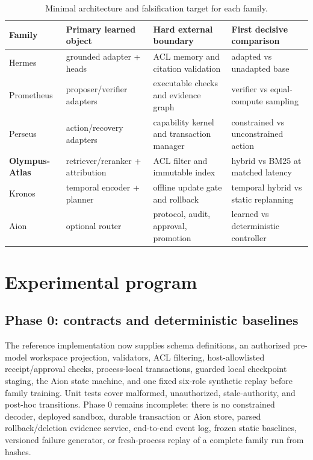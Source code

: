 \documentclass[10pt]{article}
\newcommand{\atlas}{\textbf{Olympus-Atlas}}
\begin{document}
\begin{table}[t]
\centering
\scriptsize
\begin{tabularx}{\linewidth}{l X X X}
\toprule
Family & Primary learned object & Hard external boundary & First decisive comparison \\
\midrule
Hermes & grounded adapter + heads & ACL memory and citation validation & adapted vs unadapted base \\
Prometheus & proposer/verifier adapters & executable checks and evidence graph & verifier vs equal-compute sampling \\
Perseus & action/recovery adapters & capability kernel and transaction manager & constrained vs unconstrained action \\
\atlas & retriever/reranker + attribution & ACL filter and immutable index & hybrid vs BM25 at matched latency \\
Kronos & temporal encoder + planner & offline update gate and rollback & temporal hybrid vs static replanning \\
Aion & optional router & protocol, audit, approval, promotion & learned vs deterministic controller \\
\bottomrule
\end{tabularx}
\caption{Minimal architecture and falsification target for each family.}
\label{tab:families}
\end{table}

\section{Experimental program}

\subsection{Phase 0: contracts and deterministic baselines}

The reference implementation now supplies schema definitions, an authorized
pre-model workspace projection, validators, ACL filtering, host-allowlisted
receipt/approval checks, process-local transactions, guarded local checkpoint
staging, the Aion state machine, and one fixed six-role synthetic replay before
family training. Unit tests cover
malformed, unauthorized, stale-authority, and post-hoc transitions. Phase 0
remains incomplete: there is no constrained decoder, deployed sandbox, durable
transaction or Aion store, parsed rollback/deletion evidence service, end-to-end
event log, frozen static baselines, versioned failure generator, or fresh-process
replay of a complete family run from hashes.
\end{document}
